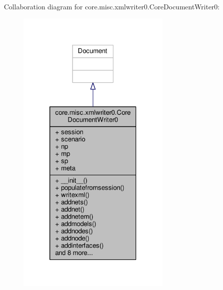 Collaboration diagram for core.\+misc.\+xmlwriter0.\+Core\+Document\+Writer0\+:
\nopagebreak
\begin{figure}[H]
\begin{center}
\leavevmode
\includegraphics[width=211pt]{classcore_1_1misc_1_1xmlwriter0_1_1_core_document_writer0__coll__graph}
\end{center}
\end{figure}
